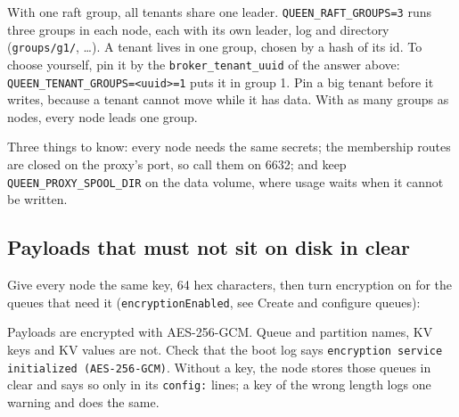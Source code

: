 With one raft group, all tenants share one leader. \texttt{QUEEN\_RAFT\_GROUPS=3} runs three groups
in each node, each with its own leader, log and directory (\texttt{groups/g1/}, \ldots). A tenant
lives in one group, chosen by a hash of its id. To choose yourself, pin it by the
\texttt{broker\_tenant\_uuid} of the answer above: \texttt{QUEEN\_TENANT\_GROUPS=<uuid>=1} puts it in
group 1. Pin a big tenant before it writes, because a tenant cannot move while it has data. With as many groups as nodes, every node leads one group.



Three things to know: every node needs the same secrets; the membership routes are closed on the
proxy's port, so call them on 6632; and keep \texttt{QUEEN\_PROXY\_SPOOL\_DIR} on the data volume,
where usage waits when it cannot be written.

\subsection{Payloads that must not sit on disk in clear}

Give every node the same key, 64 hex characters, then turn encryption on for the queues that need
it (\texttt{encryptionEnabled}, see Create and configure queues):


Payloads are encrypted with AES-256-GCM. Queue and partition names, KV keys and KV values are not.
Check that the boot log says \texttt{encryption service initialized (AES-256-GCM)}. Without a key, the
node stores those queues in clear and says so only in its \texttt{config:} lines; a key of the wrong
length logs one warning and does the same.


